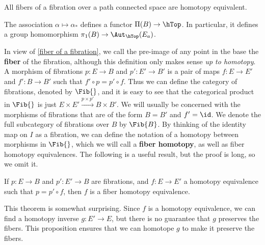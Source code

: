 \begin{cor}
\label{fiber of a fibration}
All fibers of a fibration over a path connected space are homotopy equivalent.
\end{cor}

\begin{cor}
The association $\alpha \mapsto \alpha_*$ defines a functor $\Pi(B) \rightarrow \hTop$. In particular, it defines a group homomorphism $\pi_1(B) \rightarrow \Aut_{\hTop}(E_a)$.
\end{cor}

In view of \cref{fiber of a fibration}, we call the pre-image of any point in the base the \textbf{fiber} of the fibration, although this definition only makes sense \emph{up to homotopy}. A morphism of fibrations $p : E \rightarrow B$ and $p' : E' \rightarrow B'$ is a pair of maps $f : E \rightarrow E'$ and $f' : B \rightarrow B'$ such that $f' \circ p = p' \circ f$. Thus we can define the category of fibrations, denoted by $\Fib{}$, and it is easy to see that the categorical product in $\Fib{}$ is just $E \times E' \stackrel{p \times p'}{\longrightarrow} B \times B'$. We will usually be concerned with the morphisms of fibrations that are of the form $B=B'$ and $f'=\id$. We denote the full subcategory of fibrations over $B$ by $\Fib{B}$. By thinking of the identity map on $I$ as a fibration, we can define the notation of a homotopy between morphisms in $\Fib{}$, which we will call a \textbf{fiber homotopy}, as well as fiber homotopy equivalences. The following is a useful result, but the proof is long, so we omit it.

\begin{prop}
\label{homotopy equivalence of fibrations is a fiber homotopy equivalence}
If $p : E \rightarrow B$ and $p' : E' \rightarrow B$ are fibrations, and $f : E \rightarrow E'$ a homotopy equivalence such that $p = p' \circ f$, then $f$ is a fiber homotopy equivalence.
\end{prop}
This theorem is somewhat surprising. Since $f$ is a homotopy equivalence, we can find a homotopy inverse $g : E' \rightarrow E$, but there is no guarantee that $g$ preserves the fibers. This proposition ensures that we can homotope $g$ to make it preserve the fibers.

